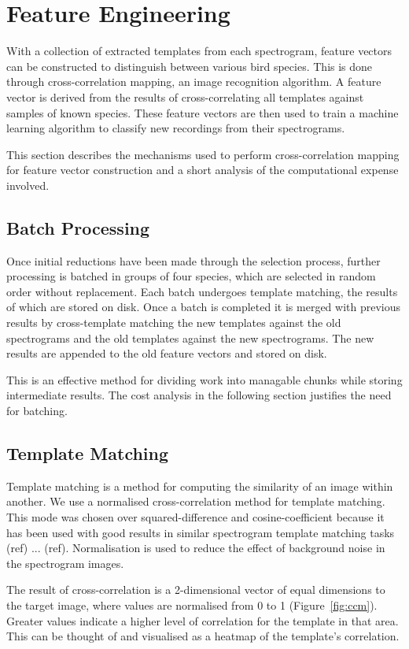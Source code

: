 \section{Feature Engineering}\label{sec:ccm}
With a collection of extracted templates from each spectrogram, feature vectors
can be constructed to distinguish between various bird species.
This is done through cross-correlation mapping, an image recognition algorithm.
A feature vector is derived from the results of cross-correlating all
templates against samples of known species.
These feature vectors are then used to train a machine learning algorithm to
classify new recordings from their spectrograms.

This section describes the mechanisms used to perform cross-correlation mapping
for feature vector construction and a short analysis of the computational
expense involved.

\subsection{Batch Processing}
Once initial reductions have been made through the selection process,
further processing is batched in groups of four species, which are selected in
random order without replacement.
Each batch undergoes template matching, the results of which are stored on disk.
Once a batch is completed it is merged with previous results by cross-template
matching the new templates against the old spectrograms and the old templates
against the new spectrograms.
The new results are appended to the old feature vectors and stored on disk.

This is an effective method for dividing work into managable chunks while storing
intermediate results.
The cost analysis in the following section justifies the need for batching.

\subsection{Template Matching}
Template matching is a method for computing the similarity of an image within
another.
We use a normalised cross-correlation method for template matching.
This mode was chosen over squared-difference and cosine-coefficient because it
has been used with good results in similar spectrogram template matching tasks
(ref) ... (ref).
Normalisation is used to reduce the effect of background noise in the
spectrogram images.

The result of cross-correlation is a 2-dimensional vector of equal dimensions to
the target image, where values are normalised from 0 to 1 (Figure~\ref{fig:ccm}).
Greater values indicate a higher level of correlation for the template in that
area.
This can be thought of and visualised as a heatmap of the template's correlation.

